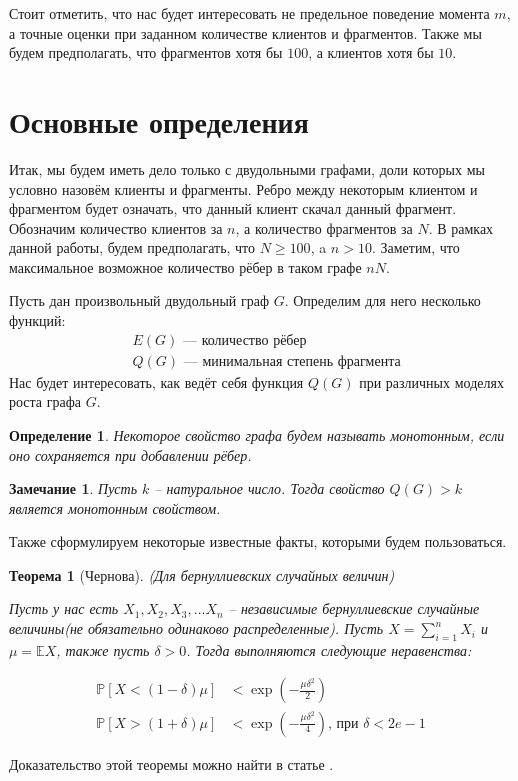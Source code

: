 \documentclass{matmex-diploma-custom}
\newcommand{\Expect}{\mathbb E}
\newcommand{\PRob}{\mathbb P}
\newcommand{\geqs}{\geqslant}
\newtheorem{note}{Замечание}
\newtheorem{define}{Определение}
\theoremstyle{named}
\newtheorem*{namedtheorem}{Теорема}
\begin{document}
Стоит отметить, что нас будет интересовать не предельное поведение момента $m$, а точные оценки при заданном количестве клиентов
и фрагментов. Также мы будем предполагать, что фрагментов хотя бы $100$, а клиентов хотя бы $10$.

\section*{Основные определения}
Итак, мы будем иметь дело только с двудольными графами, доли которых мы условно назовём клиенты и фрагменты.
Ребро между некоторым клиентом и фрагментом будет означать, что данный клиент скачал данный фрагмент.
Обозначим количество клиентов за $n$, а количество фрагментов за $N$. 
В рамках данной работы, будем предполагать, что $N \geqs 100$, a $n > 10$.
Заметим, что максимальное возможное количество рёбер в таком графе $nN$.

Пусть дан произвольный двудольный граф $G$. Определим для него несколько функций:
\begin{align*}
&E(G) \text{ --- количество рёбер}\\
&Q(G) \text{ --- минимальная степень фрагмента}
\end{align*}
Нас будет интересовать, как ведёт себя функция $Q(G)$ при различных моделях роста графа $G$.

\begin{define}
Некоторое свойство графа будем называть монотонным, если оно сохраняется при добавлении рёбер.
\end{define}

\begin{note} \label{note1}
Пусть $k$ -- натуральное число. Тогда свойство $Q(G) > k$ является монотонным свойством.
\end{note}

Также сформулируем некоторые известные факты, которыми будем пользоваться.

\newpage

\begin{namedtheorem}[Чернова] (Для бернуллиевских случайных величин) \label{Cher} 

Пусть у нас есть $X_1, X_2, X_3, \dots X_n$ -- 
независимые бернуллиевские случайные величины(не обязательно одинаково распределенные). Пусть $X = \sum\limits_{i = 1}^n X_i$ и
$\mu = \Expect X$, также пусть $\delta > 0$. Тогда выполняются следующие неравенства:

\begin{align}\label{ch_1}
\PRob[X < (1-\delta)\mu] &< \exp\left(- \frac{\mu \delta^2}{2} \right)
\\\label{ch_2}
\PRob[X > (1+\delta)\mu] &< \exp\left(- \frac{\mu \delta^2}{4} \right) \text{, при } \delta < 2e - 1
\end{align}
\end{namedtheorem}
Доказательство этой теоремы можно найти в статье \cite{chernov}.
\end{document}

